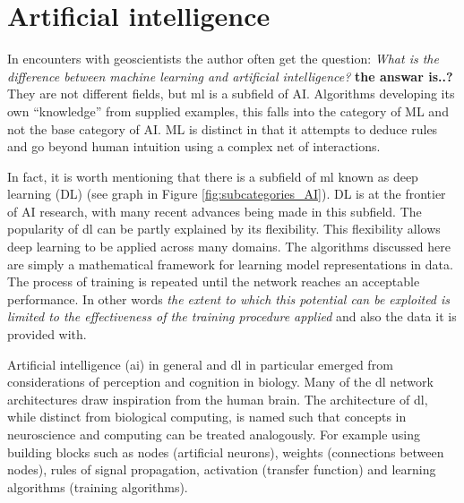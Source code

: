 
\section{Artificial intelligence}

In encounters with geoscientists the author often get the question: \textit{What is the difference between machine learning and artificial intelligence?} \textbf{the answar is..?} They are not different fields, but \acrfull{ml} is a subfield of AI. Algorithms developing its own ``knowledge'' from supplied examples, this falls into the category of ML and not the base category of AI. ML is distinct in that it attempts to deduce rules and go beyond human intuition using a complex net of interactions. 

In fact, it is worth mentioning that there is a subfield of \acrshort{ml} known as deep learning (DL) (see graph in Figure \ref{fig:subcategories_AI}). %
 DL is at the frontier of AI research, with many recent advances being made in this subfield. The popularity of \acrshort{dl} can be partly explained by its flexibility. This flexibility allows deep learning to be applied across many domains. The algorithms discussed here are simply a mathematical framework for learning model representations in data. The process of training is repeated until the network reaches an acceptable performance. In other words \textit{the extent to which this potential can be exploited is limited to the effectiveness of the training procedure applied} and also the data it is provided with. 


Artificial intelligence (\acrshort{ai}) in general and \acrshort{dl} in particular emerged from considerations of perception and cognition in biology. Many of the \acrshort{dl} network architectures draw inspiration from the human brain. The architecture of \acrshort{dl}, while distinct from biological computing, is named such that concepts in neuroscience and computing can be treated analogously. For example using building blocks such as nodes (artificial neurons), weights (connections between nodes), rules of signal propagation, activation (transfer function) and learning algorithms (training algorithms). %

